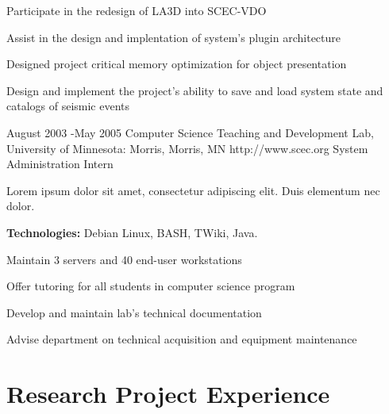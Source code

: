 \documentclass[10pt]{article} %
\begin{document}
\begin{itemize-noindent}
\item{Participate in the redesign of LA3D into SCEC-VDO}
\item{Assist in the design and implentation of system's plugin architecture}
\item{Designed project critical memory optimization for object presentation}
\item{Design and implement the project's ability to save and load system state and catalogs of seismic events}
\end{itemize-noindent}


\job
{August 2003 -}{May 2005}
{Computer Science Teaching and Development Lab, University of Minnesota: Morris, Morris, MN}
{http://www.scec.org}
{System Administration Intern}
{Lorem ipsum dolor sit amet, consectetur adipiscing elit. Duis elementum nec dolor. \\
\rule{0mm}{5mm}\textbf{Technologies:} Debian Linux, BASH, TWiki, Java.}

\begin{itemize-noindent}
\item{Maintain 3 servers and 40 end-user workstations}
\item{Offer tutoring for all students in computer science program}
\item{Develop and maintain lab's technical documentation}
\item{Advise department on technical acquisition and equipment maintenance}
\end{itemize-noindent}


\section{Research Project Experience}
\end{document}
